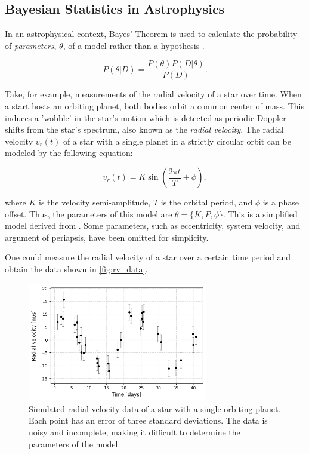 \documentclass[preprint,longauthor]{aastex631}
\numberwithin{equation}{section}
\begin{document}
\subsection{Bayesian Statistics in Astrophysics}

In an astrophysical context, Bayes' Theorem is used to calculate the probability of \textit{parameters}, $\theta$, of a model rather than a hypothesis \citep{brewer1BayesianInference2018}.

\begin{equation}
  \label{eq:bayes_theorem_params}
  P(\theta|D) = \frac{P(\theta)P(D|\theta)}{P(D)}.
\end{equation}

Take, for example, measurements of the radial velocity of a star over time. When a start hosts an orbiting planet, both bodies orbit a common center of mass. This induces a 'wobble' in the star's motion which is detected as periodic Doppler shifts from the star's spectrum, also known as the \textit{radial velocity}. The radial velocity $v_r(t)$ of a star with a single planet in a strictly circular orbit can be modeled by the following equation:

\begin{equation}
  \label{eq:rv_model}
  v_r(t) = K \sin\left(\frac{2\pi t}{T} + \phi\right),
\end{equation}

where $K$ is the velocity semi-amplitude, $T$ is the orbital period, and $\phi$ is a phase offset. Thus, the parameters of this model are $\theta = \{K,P,\phi\}$. This is a simplified model derived from \citet{lovisRadialVelocityTechniques2010}. Some parameters, such as eccentricity, system velocity, and argument of periapsis, have been omitted for simplicity.

One could measure the radial velocity of a star over a certain time period and obtain the data shown in \autoref{fig:rv_data}.

\begin{figure}[ht!]
\centering
\includegraphics[width=0.7\textwidth]{../scripts/2.2/figures/data.png}
\caption{Simulated radial velocity data of a star with a single orbiting planet. Each point has an error of three standard deviations. The data is noisy and incomplete, making it difficult to determine the parameters of the model.}
\label{fig:rv_data}
\end{figure}
\end{document}
